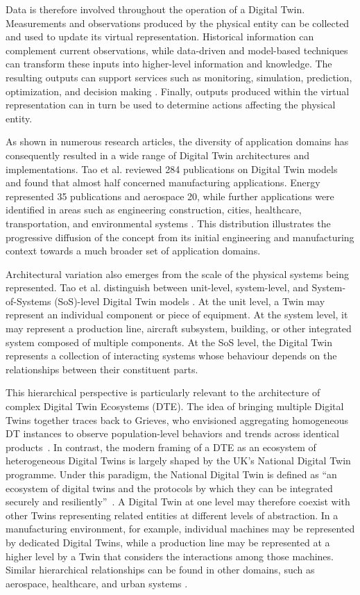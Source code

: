 Data is therefore involved throughout the operation of a Digital Twin. Measurements and observations produced by the physical entity can be collected and used to update its virtual representation. Historical information can complement current observations, while data-driven and model-based techniques can transform these inputs into higher-level information and knowledge. The resulting outputs can support services such as monitoring, simulation, prediction, optimization, and decision making \cite{qi2021,tao2022}. Finally, outputs produced within the virtual representation can in turn be used to determine actions affecting the physical entity.

As shown in numerous research articles, the diversity of application domains has consequently resulted in a wide range of Digital Twin architectures and implementations. Tao et al. reviewed 284 publications on Digital Twin models and found that almost half concerned manufacturing applications. Energy represented 35 publications and aerospace 20, while further applications were identified in areas such as engineering construction, cities, healthcare, transportation, and environmental systems \cite{tao2022}. This distribution illustrates the progressive diffusion of the concept from its initial engineering and manufacturing context towards a much broader set of application domains.

Architectural variation also emerges from the scale of the physical systems being represented. Tao et al. distinguish between unit-level, system-level, and System-of-Systems (SoS)-level Digital Twin models \cite{tao2022}. At the unit level, a Twin may represent an individual component or piece of equipment. At the system level, it may represent a production line, aircraft subsystem, building, or other integrated system composed of multiple components. At the SoS level, the Digital Twin represents a collection of interacting systems whose behaviour depends on the relationships between their constituent parts.

This hierarchical perspective is particularly relevant to the architecture of complex Digital Twin Ecosystems (DTE).
%
The idea of bringing multiple Digital Twins together traces back to Grieves, who envisioned aggregating homogeneous DT instances to observe population-level behaviors and trends across identical products~\cite{Grtz2026}. In contrast, the modern framing of a DTE as an ecosystem of heterogeneous Digital Twins is largely shaped by the UK's National Digital Twin programme.
%
Under this paradigm, the National Digital Twin is defined as “an ecosystem of digital twins and the protocols by which they can be integrated securely and resiliently”~\cite{dtarch}. 
%
A Digital Twin at one level may therefore coexist with other Twins representing related entities at different levels of abstraction. In a manufacturing environment, for example, individual machines may be represented by dedicated Digital Twins, while a production line may be represented at a higher level by a Twin that considers the interactions among those machines. Similar hierarchical relationships can be found in other domains, such as aerospace, healthcare, and urban systems \cite{tao2022}.

